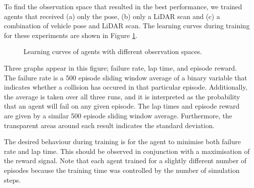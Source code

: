 To find the observation space that resulted in the best performance, we trained agents that received (a) only the pose, (b) only a LiDAR scan and (c) a combination of vehicle pose and LiDAR scan.
The learning curves during training for these experiments are shown in Figure \ref{fig:obs_space}. 
\begin{figure}[b]
    \centering
    
    \caption[Learning curves of agents with different observation spaces]{Learning curves of agents with different observation spaces.}
    \label{fig:obs_space}
\end{figure}
Three graphs appear in this figure; failure rate, lap time, and episode reward.
The failure rate is a 500 episode sliding window average of a binary variable that indicates whether a collision has occured in that particular episode.
Additionally, the average is taken over all three runs, and it is interpreted as the probability that an agent will fail on any given episode.
The lap times and episode reward are given by a similar 500 episode sliding window average.
Furthermore, the transparent areas around each result indicates the standard deviation.

The desired behaviour during training is for the agent to minimise both failure rate and lap time.
This should be observed in conjunction with a maximisation of the reward signal.
Note that each agent trained for a slightly different number of episodes because the training time was controlled by the number of simulation steps.



